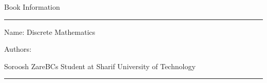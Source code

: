 \newpage
\thispagestyle{empty}
\begin{center}
    Book Information
\end{center}

\rule{\textwidth}{0.5pt}

\scriptsize{

Name: Discrete Mathematics


Authors:
\begin{AFFILIATIONS}
    \AFFILIATIONROW
    {Soroosh Zare}{BCs Student at Sharif University of Technology}{}
    {}{}{}
    {}{}{}
\end{AFFILIATIONS}

}

\rule{\textwidth}{0.5pt}


